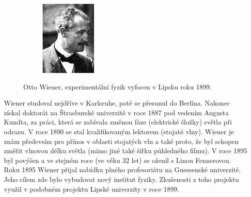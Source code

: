 \documentclass[12pt,a4paper,titlepage,final]{report}
\begin{document}
\begin{figure}[!htb]
\begin{subfigure}[b]{0.4\textwidth}
 		\includegraphics[width=\textwidth]{Otto_Wiener_mini}
	\end{subfigure}
	
	\caption{Otto Wiener, experimentální fyzik  vyfocen v Lipsku roku 1899.}\label{fig:otto}
\end{figure}       

Wiener studoval nejdříve v Karlsruhe, poté se přesunul do Berlína. Nakonec získal doktorát na Štrasburské univerzitě v roce 1887
pod vedením Augusta Kundta, za práci, která se zabívala změnou fáze (elektrické šložky) světla při odrazu. V roce 1890 se stal kvalifikovaným lektorem  (stojaté vlny). Wiener je znám předevsím pro přínos v oblasti stojatých vln a také proto, že byl schopen změřit 
vlnovou délku světla (mimo jiné také šířku půhledného filmu). V roce 1895 byl povýšen a ve stejném roce (ve věku 32 let) se oženil s Linou Fennerovou. 
Roku 1895 Wiener přijal nabídku plného profesoriátu na Guessenské univerzitě. Jeho cílem zde bylo vybudovat nový institut fyziky. 
Zkušenosti z toho projektu využil v podobném projektu Lipské univerzity v roce 1899. \cite{encyclopedia_otto}
\end{document}
